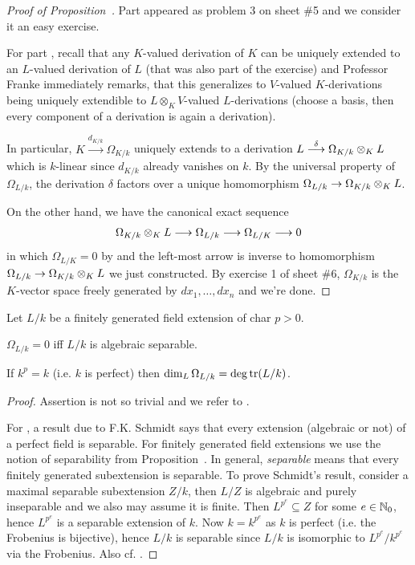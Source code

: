 \documentclass[a4paper,parskip=half,numbers=enddot, DIV=12]{scrreprt}
\begin{document}
\begin{proof}[Proof of Proposition~]
	Part  appeared as problem 3 on sheet \#5 and we consider it an easy exercise.
	
	For part , recall that any $K$-valued derivation of $K$ can be uniquely extended to an $L$-valued derivation of $L$ (that was also part of the exercise) and Professor Franke immediately remarks, that this generalizes to $V$-valued $K$-derivations being uniquely extendible to $L\otimes_KV$-valued $L$-derivations (choose a basis, then every component of a derivation is again a derivation). 
	
	In particular, $K\xrightarrow{d_{K/k}}\Omega_{K/k}$ uniquely extends to a derivation $L\morphism[\delta]\Omega_{K/k}\otimes_KL$ which is $k$-linear since $d_{K/k}$ already vanishes on $k$. By the universal property of $\Omega_{L/k}$, the derivation $\delta$ factors over a unique homomorphism $\Omega_{L/k}\morphism\Omega_{K/k}\otimes_K L$.
	
	On the other hand, we have the canonical exact sequence
	\begin{align*}
		\Omega_{K/k}\otimes_KL\morphism\Omega_{L/k}\morphism\Omega_{L/K}\morphism 0
	\end{align*}
	in which $\Omega_{L/K}=0$ by  and the left-most arrow is inverse to homomorphism $\Omega_{L/k}\morphism\Omega_{K/k}\otimes_K L$ we just constructed. By exercise 1 of sheet \#6, $\Omega_{K/k}$ is the $K$-vector space freely generated by $dx_1,\ldots,dx_n$ and we're done.
\end{proof}
\begin{prop}
    Let $L/k$ be a finitely generated field extension of char $p>0$. 
    \begin{alphanumerate}
      \item 
        $\Omega_{L/k} =0$ iff $L/k$ is algebraic separable.
      \item 
        If $k^p =k$ (i.e. $k$ is perfect) then $\dim_L\Omega_{L/k} = \deg\operatorname{tr}(L/k)$.
    \end{alphanumerate}
\end{prop}
\begin{proof}
	Assertion  is not so trivial and we refer to \cite[Proposition~5.6]{kunzKahler}.
	
	For , a result due to F.K. Schmidt says that every extension (algebraic or not) of a perfect field is separable. For finitely generated field extensions we use the notion of separability from Proposition~. In general, \emph{separable} means that every finitely generated subextension is separable. To prove Schmidt's result, consider a maximal separable subextension $Z/k$, then $L/Z$ is algebraic and purely inseparable and we also may assume it is finite. Then $L^{p^e}\subseteq Z$ for some $e\in\mathbb{N}_0$, hence $L^{p^e}$ is a separable extension of $k$. Now $k=k^{p^e}$ as $k$ is perfect (i.e. the Frobenius is bijective), hence $L/k$ is separable since $L/k$ is isomorphic to $L^{p^e}/k^{p^e}$ via the Frobenius. Also cf. \cite[Proposition~5.18]{kunzKahler}.
\end{proof}
\end{document}
